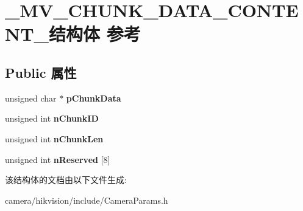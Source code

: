 \hypertarget{struct___m_v___c_h_u_n_k___d_a_t_a___c_o_n_t_e_n_t__}{}\section{\+\_\+\+M\+V\+\_\+\+C\+H\+U\+N\+K\+\_\+\+D\+A\+T\+A\+\_\+\+C\+O\+N\+T\+E\+N\+T\+\_\+结构体 参考}
\label{struct___m_v___c_h_u_n_k___d_a_t_a___c_o_n_t_e_n_t__}
\subsection*{Public 属性}
\begin{DoxyCompactItemize}
\item 
\mbox{\label{struct___m_v___c_h_u_n_k___d_a_t_a___c_o_n_t_e_n_t___ad8ca88a81060bc0d5fe76029f65c0a52}} 
unsigned char $\ast$ {\bfseries p\+Chunk\+Data}
\item 
\mbox{\label{struct___m_v___c_h_u_n_k___d_a_t_a___c_o_n_t_e_n_t___a194d104d485256a8785bc685cb019a1d}} 
unsigned int {\bfseries n\+Chunk\+ID}
\item 
\mbox{\label{struct___m_v___c_h_u_n_k___d_a_t_a___c_o_n_t_e_n_t___aded61c7209d69de31123cc1369d75d26}} 
unsigned int {\bfseries n\+Chunk\+Len}
\item 
\mbox{\label{struct___m_v___c_h_u_n_k___d_a_t_a___c_o_n_t_e_n_t___a96cd847befe27317fe83529e44bbde42}} 
unsigned int {\bfseries n\+Reserved} \mbox{[}8\mbox{]}
\end{DoxyCompactItemize}


该结构体的文档由以下文件生成\+:\begin{DoxyCompactItemize}
\item 
camera/hikvision/include/Camera\+Params.\+h\end{DoxyCompactItemize}

